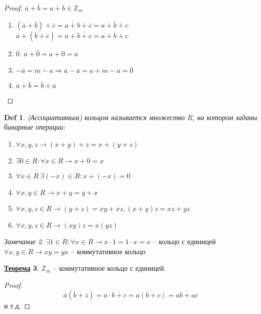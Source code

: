 \documentclass[12pt]{article}
\newenvironment{MyList}[1][4pt]{
  \begin{enumerate}[1.]
  \setlength{\parskip}{0pt}
  \setlength{\itemsep}{#1}
}{       
  \end{enumerate}
}
\def\Z{\mathbb{Z}}       %
\def\SO{\Rightarrow}     %
\theoremstyle{definition} %
\newtheorem{Thm}{\underline{Теорема}}[subsection] %
\theoremstyle{plain} %
\newtheorem{Def}[Thm]{Def} %
\theoremstyle{remark} %
\newtheorem{Rem}[Thm]{Замечание} %
\begin{document}
{\begin{proof}
    $\overline{a} + \overline{b} = \overline{a + b} \in \Z_m$
    \begin{MyList}
        \item $(\overline{a} + \overline{b}) + \overline{c} = \overline{a + b} + \overline{c} = \overline{a + b + c}$ \\
        $\overline{a} + (\overline{b} + \overline{c}) = \overline{a} + \overline{b + c} = \overline{a + b + c}$
        \item $\overline{0}$. $\overline{a} + \overline{0} = \overline{a + 0} = \overline{a}$
        \item $-\overline{a} = \overline{m - a} \SO \overline{a} - \overline{a} = \overline{a + m - a} = \overline{0}$
        \item $\overline{a} + \overline{b} = \overline{b} + \overline{a}$      
    \end{MyList} 
\end{proof}

\begin{Def}
    (Ассоциативным) кольцом называется множество $R$, на котором заданы бинарные операции:
    \begin{MyList}
        \item $\forall x, y, z \to (x + y) + z = x + (y + z)$ 
        \item $\exists 0 \in R : \forall x \in R \to x + 0 = x$ 
        \item $\forall x \in R \ \exists (-x) \in R : x + (-x) = 0$ 
        \item $\forall x, y \in R \to x + y = y + x$ 
        \item $\forall x, y, z \in R \to (y + z) = xy + xz, (x + y)z = xz + yz$ 
        \item $\forall x, y, z \in R \to (xy)z = x(yz)$ 
    \end{MyList}
\end{Def}

\begin{Rem}
    $\exists 1 \in R : \forall x \in R \to x \cdot 1 = 1 \cdot x = x$ -- кольцо с единицей \\
    $\forall x, y \in R \to xy = yx$ -- коммутативное кольцо 
\end{Rem}

\begin{Thm}
    $\Z_m$ -- коммутативное кольцо с единицей.
\end{Thm}

\begin{proof}
    \[\overline{a}(\overline{b} + \overline{z}) = \overline{a} \cdot \overline{b + c} = \overline{a(b + c)} = \overline{ab + ac}\]
    и т.д.
\end{proof}

}
\end{document}
